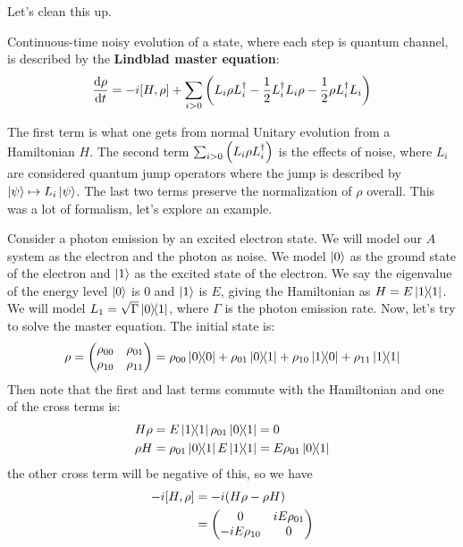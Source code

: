 Let's clean this up.
\begin{theorem}
    Continuous-time noisy evolution of a state, where each step is quantum channel,
    is described by the \textbf{Lindblad master equation}:
    \[ \dv{\rho}{t} = -i [H, \rho] + \sum_{i > 0} \qty(L_i \rho L_i^{\dagger} - \frac{1}{2} L_i^{\dagger} L_i \rho - \frac{1}{2} \rho L_i^{\dagger} L_i) \]
\end{theorem}
The first term is what one gets from normal Unitary evolution from a Hamiltonian $H$. The second term
$ \sum_{i > 0} \qty(L_i \rho L_i^{\dagger})$ is the effects of noise,
where $L_i$ are considered quantum jump operators where the jump is described by $\ket{\psi} \mapsto L_i \ket{\psi}$.
The last two terms preserve the normalization of $\rho$ overall. This was a lot of formalism, let's explore an example.
\begin{example}
    Consider a photon emission by an excited electron state. We will
    model our $A$ system as the electron and the photon as noise. We model $\ket{0}$ as the ground state of the electron
    and $\ket{1}$ as the excited state of the electron. We say the eigenvalue of the energy level $\ket{0}$ is $0$ and $\ket{1}$ is $E$,
    giving the Hamiltonian as $H = E \ketbra{1}$. We will model $L_1 = \sqrt{\Gamma} \ketbra{0}{1}$, where $\Gamma$ is the photon emission rate.
    Now, let's try to solve the master equation. The initial state is:
    \[ \rho = \begin{pmatrix}
        \rho_{00} & \rho_{01} \\ \rho_{10} & \rho_{11}
    \end{pmatrix} = \rho_{00} \ketbra{0} + \rho_{01} \ketbra{0}{1} + \rho_{10} \ketbra{1}{0} + \rho_{11} \ketbra{1}{1} \]
    Then note that the first and last terms commute with the Hamiltonian and one of the cross terms is:
    \begin{align*}
        H \rho &= E \ketbra{1}{1} \rho_{01} \ketbra{0}{1} = 0 \\
        \rho H &= \rho_{01} \ketbra{0}{1} E \ketbra{1}{1} = E \rho_{01} \ketbra{0}{1}
    \end{align*}
    the other cross term will be negative of this, so we have
    \begin{align*}
        -i [H, \rho] &= -i \qty(H \rho - \rho H) \\
        &= \begin{pmatrix}
            0 & iE \rho_{01} \\
            -iE\rho_{10} & 0
        \end{pmatrix}

\end{align*}
\end{example}
